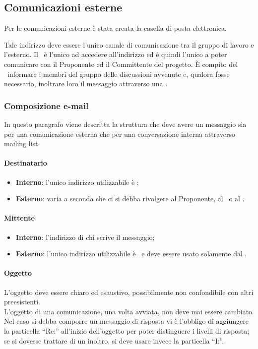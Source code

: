 \documentclass[../NormeDiProgetto.tex]{subfiles}
\begin{document}
			\subsection{Comunicazioni esterne}
				Per le comunicazioni esterne è stata creata la casella di posta
				elettronica:
				\begin{center}
					\mailkaleidoscode
				\end{center}
				Tale indirizzo deve essere l'unico canale di comunicazione tra il
				gruppo di lavoro e l'esterno.
				Il \responsabilediprogetto\ è l'unico ad accedere
				all'indirizzo ed è quindi l'unico a poter comunicare con il Proponente ed il
				Committente del progetto. È compito del \responsabilediprogetto\ informare
				i membri del gruppo delle discussioni avvenute e,
				qualora fosse necessario, inoltrare loro il messaggio attraverso
				una .
				
				\subsubsection{Composizione e-mail}
					In questo paragrafo viene descritta la struttura che deve avere
					un messaggio sia per una comunicazione esterna che per una
					conversazione interna attraverso mailing list.
					\paragraph{Destinatario}
						\begin{itemize}
							\item \textbf{Interno}: l'unico indirizzo utilizzabile è
							\mailkaleidoscode;
							\item \textbf{Esterno}: varia a seconda che ci si debba
							rivolgere  al Proponente, al \vardanega\ o al \cardin.
						\end{itemize}
					\paragraph{Mittente}
						\begin{itemize}
							\item \textbf{Interno}: l'indirizzo di chi scrive
							il messaggio;
							\item \textbf{Esterno}: l'unico indirizzo utilizzabile è
							\mailkaleidoscode\ e deve essere usato solamente dal
							\responsabilediprogetto.
						\end{itemize}
					\paragraph{Oggetto\\}
						L'oggetto deve essere chiaro ed esaustivo, possibilmente non
						confondibile con altri preesistenti.\\
						L'oggetto di una comunicazione, una volta avviata, non deve mai essere cambiato.\\
						Nel caso si debba comporre un messaggio di risposta vi è l'obbligo di aggiungere la
						particella ``Re:'' all'inizio dell'oggetto per poter distinguere i
						livelli di risposta; se si dovesse trattare di un inoltro, si deve
						usare invece la particella ``I:''.
\end{document}
